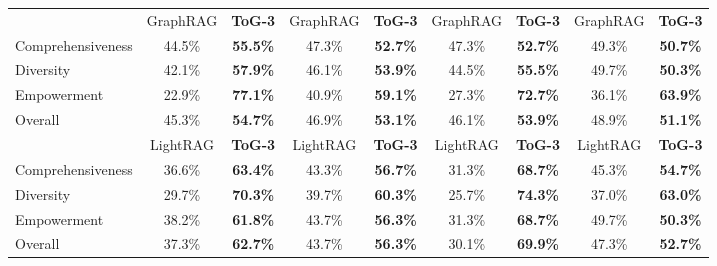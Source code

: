 \begin{table}[t]
{\begin{tabular}{@{}l|cccccccc@{}}
                      & GraphRAG & \textbf{ToG-3} & GraphRAG & \textbf{ToG-3} & GraphRAG & \textbf{ToG-3} & GraphRAG & \textbf{ToG-3} \\
 \cmidrule(lr){2-3} \cmidrule(lr){4-5} \cmidrule(lr){6-7} \cmidrule(lr){8-9}
Comprehensiveness      & 44.5\%      & \textbf{55.5\%}     & 47.3\%      & \textbf{52.7\%}     &  47.3\%     & \textbf{52.7\%}     & 49.3\%      & \textbf{50.7\%}     \\
Diversity            & 42.1\%      & \textbf{57.9\%}     & 46.1\%      & \textbf{53.9\%}     & 44.5\%      & \textbf{55.5\%}     & 49.7\%     & \textbf{50.3\%}     \\
Empowerment              & 22.9\%      & \textbf{77.1\%}     & 40.9\%      & \textbf{59.1\%}     &  27.3\%     & \textbf{72.7\%}     & 36.1\%      & \textbf{63.9\%}     \\
Overall                & 45.3\%      & \textbf{54.7\%}     & 46.9\%      & \textbf{53.1\%}     & 46.1\%      & \textbf{53.9\%}     & 48.9\%      & \textbf{51.1\%}     \\
\midrule

                      & LightRAG & \textbf{ToG-3} & LightRAG & \textbf{ToG-3} & LightRAG & \textbf{ToG-3} & LightRAG & \textbf{ToG-3} \\
 \cmidrule(lr){2-3} \cmidrule(lr){4-5} \cmidrule(lr){6-7} \cmidrule(lr){8-9}
Comprehensiveness      & 36.6\%      & \textbf{63.4\%}     & 43.3\%      & \textbf{56.7\%}     & 31.3\%      & \textbf{68.7\%}     & 45.3\%      & \textbf{54.7\%}     \\
Diversity              & 29.7\%      & \textbf{70.3\%}     & 39.7\%      & \textbf{60.3\%}     & 25.7\%      & \textbf{74.3\%}     & 37.0\%      & \textbf{63.0\%}     \\
Empowerment            & 38.2\%      & \textbf{61.8\%}     & 43.7\%      & \textbf{56.3\%}     & 31.3\%      & \textbf{68.7\%}     & 49.7\%      & \textbf{50.3\%}     \\
Overall                & 37.3\%      & \textbf{62.7\%}     & 43.7\%      & \textbf{56.3\%}     & 30.1\%      & \textbf{69.9\%}     & 47.3\%      & \textbf{52.7\%}     \\
\midrule


\end{tabular}}
\end{table}
